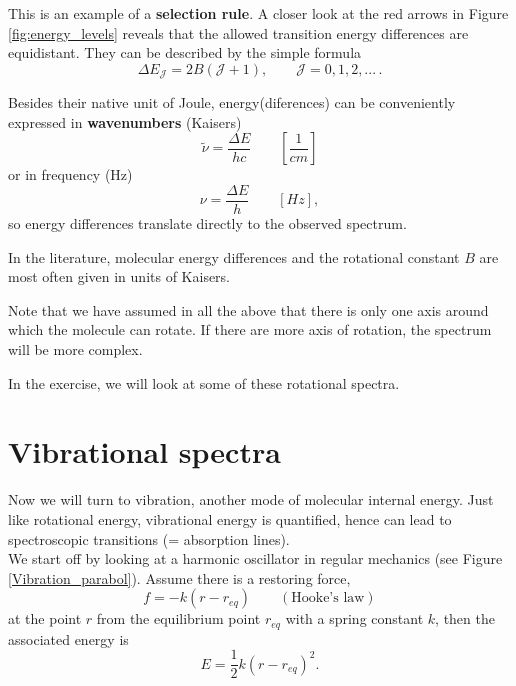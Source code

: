 This is an example of a \textbf{selection rule}. A closer look at the
red arrows in Figure \ref{fig:energy_levels} reveals that the allowed
transition energy differences are equidistant. They can be described
by the simple formula
\begin{equation}
\Delta E_\mathcal{J} = 2B(\mathcal{J}+1), \qquad \mathcal{J} = 0, 1, 2, ...\,.
\end{equation}

Besides their native unit of Joule,
energy(diferences) can be conveniently expressed in
\textbf{wavenumbers} (Kaisers)
\begin{equation}
\tilde{\nu} = \frac{\Delta E}{hc} \qquad \left[\frac{1}{cm}\right]
\end{equation}
or in frequency (Hz)
\begin{equation}
\nu = \frac{\Delta E}{h} \qquad \left[Hz\right],
\end{equation}
so energy differences translate directly to the observed spectrum.

In the literature, molecular energy differences and the rotational
constant $B$ are most often given in
units of Kaisers.

Note that we have assumed in all the above that there is only one
axis around which the molecule can rotate. If there are more axis of
rotation, the spectrum will be more complex.

In the exercise, we will look at some of these rotational spectra.


\clearpage
\section{Vibrational spectra}
Now we will turn to vibration, another mode of molecular internal energy. Just like rotational energy, vibrational energy is quantified, hence can lead to spectroscopic transitions (= absorption lines). \\
We start off by looking at a harmonic oscillator in regular mechanics (see Figure \ref{Vibration_parabol}). Assume there is a restoring force,
\begin{equation}
f = -k (r-r_{eq}) \qquad (\text{Hooke's law})
\end{equation}
at the point $r$ from the equilibrium point $r_{eq}$ with a spring constant $k$, then the associated energy is
\begin{equation}
E = \frac{1}{2}k (r-r_{eq})^2 .
\end{equation}

